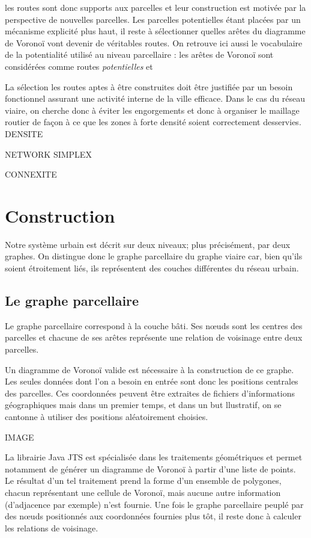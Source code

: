 \documentclass[12pt]{article}
\begin{document}
les routes sont donc supports aux parcelles et leur construction est
motivée par la perspective de nouvelles parcelles. Les parcelles
potentielles étant placées par un mécanisme explicité plus haut, il
reste à sélectionner quelles arêtes du diagramme de Voronoï vont
devenir de véritables routes. On retrouve ici aussi le vocabulaire de
la potentialité utilisé au niveau parcellaire : les arêtes de Voronoï
sont considérées comme routes \textit{potentielles} et

La sélection les routes aptes à être construites doit être justifiée
par un besoin fonctionnel assurant une activité interne de la ville
efficace. Dans le cas du réseau viaire, on cherche donc à éviter les
engorgements et donc à organiser le maillage routier de façon à ce que
les zones à forte densité soient correctement desservies. DENSITE

NETWORK SIMPLEX

CONNEXITE

\section{Construction}

Notre système urbain est décrit sur deux niveaux; plus précisément,
par deux graphes. On distingue donc le graphe parcellaire du graphe
viaire car, bien qu'ils soient étroitement liés, ils représentent des
couches différentes du réseau urbain.

\subsection{Le graphe parcellaire}

Le graphe parcellaire correspond à la couche bâti. Ses n\oe uds sont
les centres des parcelles et chacune de ses arêtes représente une
relation de voisinage entre deux parcelles.

Un diagramme de Voronoï valide est nécessaire à la construction de ce
graphe. Les seules données dont l'on a besoin en entrée sont donc les
positions centrales des parcelles. Ces coordonnées peuvent être
extraites de fichiers d'informations géographiques mais dans un
premier temps, et dans un but llustratif, on se cantonne à utiliser
des positions aléatoirement choisies.

IMAGE

La librairie Java JTS est spécialisée dans les traitements
géométriques et permet notamment de générer un diagramme de Voronoï à
partir d'une liste de points. Le résultat d'un tel traitement prend la
forme d'un ensemble de polygones, chacun représentant une cellule de
Voronoï, mais aucune autre information (d'adjacence par exemple) n'est
fournie. Une fois le graphe parcellaire peuplé par des n\oe uds
positionnés aux coordonnées fournies plus tôt, il reste donc à
calculer les relations de voisinage.
\end{document}
